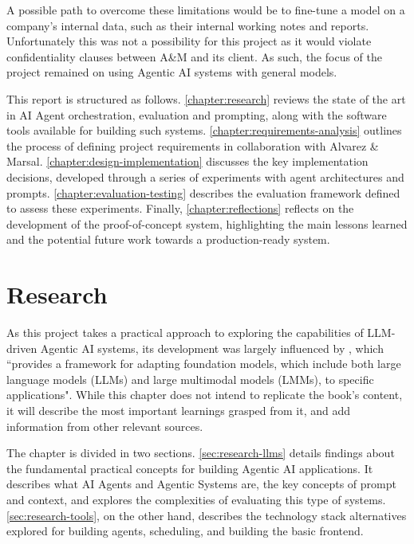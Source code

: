 \documentclass[a4paper]{report}
\begin{document}
A possible path to overcome these limitations would be to fine-tune a model on a company's internal data, such as their internal working notes and reports. Unfortunately this was not a possibility for this project as it would violate confidentiality clauses between A\&M and its client. As such, the focus of the project remained on using Agentic AI systems with general models.

This report is structured as follows. \autoref{chapter:research} reviews the state of the art in AI Agent orchestration, evaluation and prompting, along with the software tools available for building such systems. \autoref{chapter:requirements-analysis} outlines the process of defining project requirements in collaboration with Alvarez \& Marsal. \autoref{chapter:design-implementation} discusses the key implementation decisions, developed through a series of experiments with agent architectures and prompts. \autoref{chapter:evaluation-testing} describes the evaluation framework defined to assess these experiments. Finally, \autoref{chapter:reflections} reflects on the development of the proof-of-concept system, highlighting the main lessons learned and the potential future work towards a production-ready system.

\chapter{Research}
\label{chapter:research}

As this project takes a practical approach to exploring the capabilities of LLM-driven Agentic AI systems, its development was largely influenced by \cite{aiebook2025}, which ``provides a framework for adapting foundation models, which include both large language models (LLMs) and large multimodal models (LMMs), to specific applications". While this chapter does not intend to replicate the book's content, it will describe the most important learnings grasped from it, and add information from other relevant sources.

The chapter is divided in two sections. \autoref{sec:research-llms} details findings about the fundamental practical concepts for building Agentic AI applications. It describes what AI Agents and Agentic Systems are, the key concepts of prompt and context, and explores the complexities of evaluating this type of systems. \autoref{sec:research-tools}, on the other hand, describes the technology stack alternatives explored for building agents, scheduling, and building the basic frontend.
\end{document}
